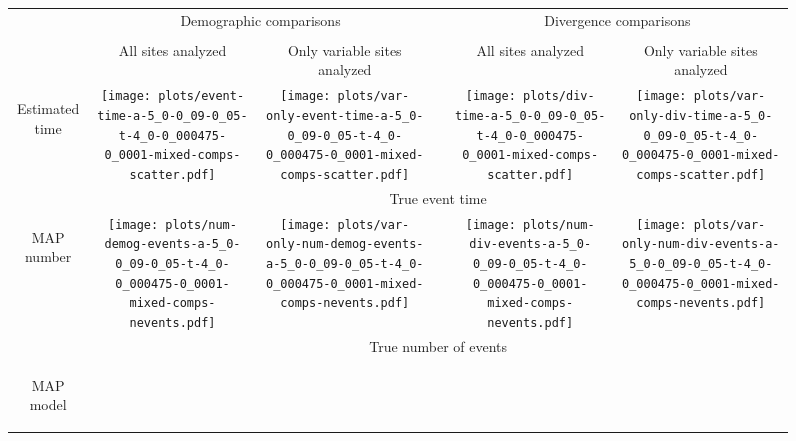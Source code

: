 \documentclass[border=10pt,varwidth=30cm]{standalone}
\begin{document}
\begin{figure}
    \centering
    \begin{tabular}{@{}cccccc@{}}
        & \multicolumn{2}{c}{\LARGE Demographic comparisons}
        &
        & \multicolumn{2}{c}{\LARGE Divergence comparisons} \\[1ex]
        \cline{2-3}\cline{5-6}
        & & & & & \\
        & \multirow{1}{0.15\textwidth}{\Large\centering All sites analyzed}
        & \multirow{1}{0.15\textwidth}{\Large\centering Only variable sites analyzed}
        &
        & \multirow{1}{0.15\textwidth}{\Large\centering All sites analyzed}
        & \multirow{1}{0.15\textwidth}{\Large\centering Only variable sites analyzed} \\[5ex]
        \multirow{1}{*}[8em]{\begin{sideways}\large Estimated time\end{sideways}}
        & \texttt{[image: plots/event-time-a-5\_0-0\_09-0\_05-t-4\_0-0\_000475-0\_0001-mixed-comps-scatter.pdf]}
        & \texttt{[image: plots/var-only-event-time-a-5\_0-0\_09-0\_05-t-4\_0-0\_000475-0\_0001-mixed-comps-scatter.pdf]}
        &
        & \texttt{[image: plots/div-time-a-5\_0-0\_09-0\_05-t-4\_0-0\_000475-0\_0001-mixed-comps-scatter.pdf]}
        & \texttt{[image: plots/var-only-div-time-a-5\_0-0\_09-0\_05-t-4\_0-0\_000475-0\_0001-mixed-comps-scatter.pdf]} \\
        & \multicolumn{5}{c}{\large True event time} \\
        \multirow{1}{*}[8em]{\begin{sideways}\large MAP number\end{sideways}}
        & \texttt{[image: plots/num-demog-events-a-5\_0-0\_09-0\_05-t-4\_0-0\_000475-0\_0001-mixed-comps-nevents.pdf]}
        & \texttt{[image: plots/var-only-num-demog-events-a-5\_0-0\_09-0\_05-t-4\_0-0\_000475-0\_0001-mixed-comps-nevents.pdf]}
        &
        & \texttt{[image: plots/num-div-events-a-5\_0-0\_09-0\_05-t-4\_0-0\_000475-0\_0001-mixed-comps-nevents.pdf]}
        & \texttt{[image: plots/var-only-num-div-events-a-5\_0-0\_09-0\_05-t-4\_0-0\_000475-0\_0001-mixed-comps-nevents.pdf]} \\
        & \multicolumn{5}{c}{\large True number of events} \\
        \multirow{1}{*}[7.5em]{\begin{sideways}\large MAP model\end{sideways}}

\end{tabular}
\end{figure}
\end{document}
